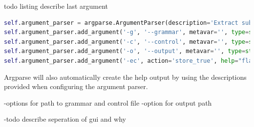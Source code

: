 todo listing describe last argument
\begin{lstlisting}[language=Python, basicstyle=\scriptsize	,caption= Argparse command-line parser configuration,label= lst:ImplementationArgparseParserConfiguration]
self.argument_parser = argparse.ArgumentParser(description='Extract sub-syntax using TPTP syntax file and a control file')
self.argument_parser.add_argument('-g', '--grammar', metavar='', type=str, required=True, help='path of the TPTP syntax file')
self.argument_parser.add_argument('-c', '--control', metavar='', type=str, required=True, help='path of the control file')
self.argument_parser.add_argument('-o', '--output', metavar='', type=str, required=False, help='optional output file name (default output.txt)', default= "output.txt")
self.argument_parser.add_argument('-ec', action='store_true', help="flag - include external comment syntax")
\end{lstlisting}

Argparse will also automatically create the help output by using the descriptions provided when configuring the argument parser.


-options for path to grammar and control file
-option for output path

-todo describe seperation of gui and why
